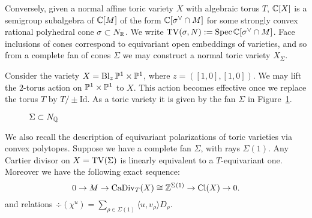 Conversely, given a normal affine toric variety \(X\) with algebraic torus \(T\), \(\mathbb{C}[X]\) is a semigroup subalgebra of \(\mathbb{C}[M]\) of the form \(\mathbb{C}[\sigma^\vee \cap M]\) for some strongly convex rational polyhedral cone \(\sigma \subset N_{\mathbb{R}}\). We write \(\operatorname{TV}(\sigma,N):= \operatorname{Spec} \mathbb{C}[\sigma^\vee \cap M] \). Face inclusions of cones correspond to equivariant open embeddings of varieties, and so from a complete fan of cones \(\Sigma\) we may construct a normal toric variety \(X_\Sigma\).
\begin{example} \label{toricexample}
Consider the variety \(X = \operatorname{Bl}_{z} \mathbb{P}^1 \times \mathbb{P}^1 \), where \(z = ( [1,0],[1,0]) \). We may lift the \(2\)-torus action on \(\mathbb{P}^1 \times \mathbb{P}^1 \) to \(X\). This action becomes effective once we replace the torus \(T\) by \(T/ \pm \text{Id}\). As a toric variety it is given by the fan \(\Sigma\) in Figure~\ref{toricfan}.

\begin{figure}[h]
\centering
	\caption{$\Sigma \subset N_{\mathbb{Q}}$ }
	\label{toricfan}
\end{figure}
\end{example}
We also recall the description of equivariant polarizations of toric varieties via convex polytopes. Suppose we have a complete fan \(\Sigma\), with rays \(\Sigma(1)\). Any Cartier divisor on \(X = \operatorname{TV}(\Sigma)\) is linearly equivalent to a \(T\)-equivariant one. Moreover we have the following exact sequence:
\begin{equation} \label{exactseq}
0 \to M \to \operatorname{CaDiv}_T(X) \cong \mathbb{Z}^{\Sigma(1)} \to \operatorname{Cl}(X) \to 0.
\end{equation}
and relations \(\div(\chi^u) = \sum_{\rho \in \Sigma(1)} \langle u, v_\rho \rangle D_\rho\).

